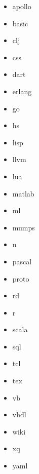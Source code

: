 \documentclass[a4paper]{article}
\begin{document}
\begin{itemize}
\item apollo

\item basic

\item clj

\item css

\item dart

\item erlang

\item go

\item hs

\item lisp

\item llvm

\item lua

\item matlab

\item ml

\item mumps

\item n

\item pascal

\item proto

\item rd

\item r

\item scala

\item sql

\item tcl

\item tex

\item vb

\item vhdl

\item wiki

\item xq

\item yaml
\end{itemize}
\end{document}
